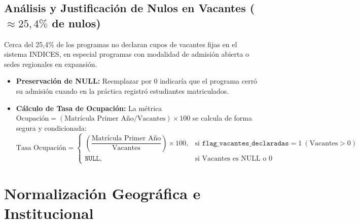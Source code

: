 \documentclass[11pt,a4paper]{article}
\begin{document}
\subsection{Análisis y Justificación de Nulos en Vacantes ($\approx 25,4\%$ de nulos)}
Cerca del 25,4\% de los programas no declaran cupos de vacantes fijas en el sistema INDICES, en especial programas con modalidad de admisión abierta o sedes regionales en expansión.
\begin{itemize}
    \item \textbf{Preservación de NULL:} Reemplazar por 0 indicaría que el programa cerró su admisión cuando en la práctica registró estudiantes matriculados.
    \item \textbf{Cálculo de Tasa de Ocupación:} La métrica $\text{Ocupación} = (\text{Matrícula Primer Año} / \text{Vacantes}) \times 100$ se calcula de forma segura y condicionada:
    \begin{equation}
    \text{Tasa Ocupación} = 
    \begin{cases}
    \left(\dfrac{\text{Matrícula Primer Año}}{\text{Vacantes}}\right) \times 100, & \text{si } \texttt{flag\_vacantes\_declaradas} = 1 \ (\text{Vacantes} > 0) \\[2mm]
    \texttt{NULL}, & \text{si Vacantes es NULL o } 0
    \end{cases}
    \end{equation}
\end{itemize}

\section{Normalización Geográfica e Institucional}
\end{document}
